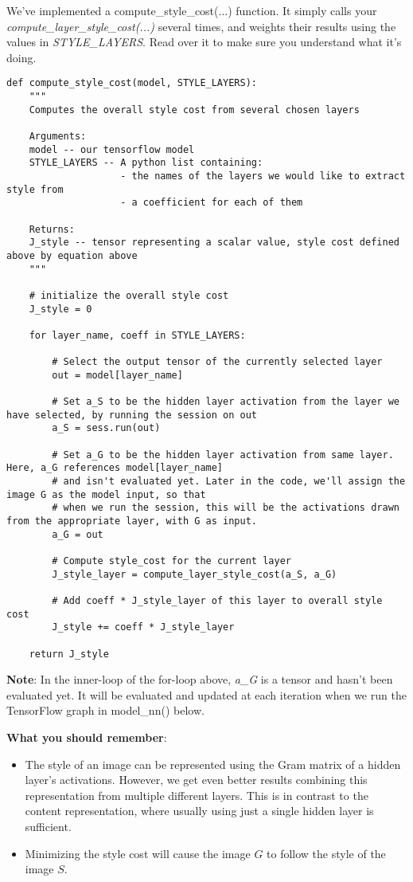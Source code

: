 {We've implemented a compute\_style\_cost(...) function. It simply calls your \emph{compute\_layer\_style\_cost(...)} several times, and weights their results using the values in \emph{STYLE\_LAYERS}. Read over it to make sure you understand what it's doing. 

\begin{verbatim}
def compute_style_cost(model, STYLE_LAYERS):
    """
    Computes the overall style cost from several chosen layers
    
    Arguments:
    model -- our tensorflow model
    STYLE_LAYERS -- A python list containing:
                    - the names of the layers we would like to extract style from
                    - a coefficient for each of them
    
    Returns: 
    J_style -- tensor representing a scalar value, style cost defined above by equation above
    """
    
    # initialize the overall style cost
    J_style = 0

    for layer_name, coeff in STYLE_LAYERS:

        # Select the output tensor of the currently selected layer
        out = model[layer_name]

        # Set a_S to be the hidden layer activation from the layer we have selected, by running the session on out
        a_S = sess.run(out)

        # Set a_G to be the hidden layer activation from same layer. Here, a_G references model[layer_name] 
        # and isn't evaluated yet. Later in the code, we'll assign the image G as the model input, so that
        # when we run the session, this will be the activations drawn from the appropriate layer, with G as input.
        a_G = out
        
        # Compute style_cost for the current layer
        J_style_layer = compute_layer_style_cost(a_S, a_G)

        # Add coeff * J_style_layer of this layer to overall style cost
        J_style += coeff * J_style_layer

    return J_style
\end{verbatim}


{\textbf{Note}}: In the inner-loop of the for-loop above, \emph{a\_G} is a tensor and hasn't been evaluated yet. It will be evaluated and updated at each iteration when we run the TensorFlow graph in model\_nn() below.\\


{\color{red}\textbf{What you should remember}:
\begin{itemize}
\item The style of an image can be represented using the Gram matrix of a hidden layer's activations. However, we get even better results combining this representation from multiple different layers. This is in contrast to the content representation, where usually using just a single hidden layer is sufficient.
\item Minimizing the style cost will cause the image $G$ to follow the style of the image $S$. 
\end{itemize}
}


}

